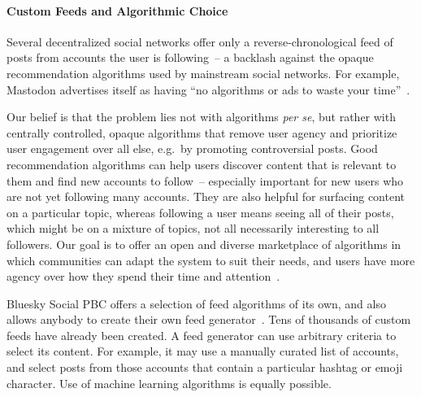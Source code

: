 \documentclass[sigconf]{acmart}
\begin{document}
\paragraph{Custom Feeds and Algorithmic Choice}

Several decentralized social networks offer only a reverse-chronological feed of posts from accounts the user is following~-- a backlash against the opaque recommendation algorithms used by mainstream social networks.
For example, Mastodon advertises itself as having ``no algorithms or ads to waste your time''~\cite{Mastodon}.

Our belief is that the problem lies not with algorithms \emph{per se}, but rather with centrally controlled, opaque algorithms that remove user agency and prioritize user engagement over all else, e.g.\ by promoting controversial posts.
Good recommendation algorithms can help users discover content that is relevant to them and find new accounts to follow~-- especially important for new users who are not yet following many accounts.
They are also helpful for surfacing content on a particular topic, whereas following a user means seeing all of their posts, which might be on a mixture of topics, not all necessarily interesting to all followers.
Our goal is to offer an open and diverse marketplace of algorithms in which communities can adapt the system to suit their needs, and users have more agency over how they spend their time and attention~\cite{AlgorithmicChoice}.

Bluesky Social PBC offers a selection of feed algorithms of its own, and also allows anybody to create their own feed generator~\cite{CustomFeeds}.
Tens of thousands of custom feeds have already been created.
A feed generator can use arbitrary criteria to select its content.
For example, it may use a manually curated list of accounts, and select posts from those accounts that contain a particular hashtag or emoji character.
Use of machine learning algorithms is equally possible.
\end{document}
